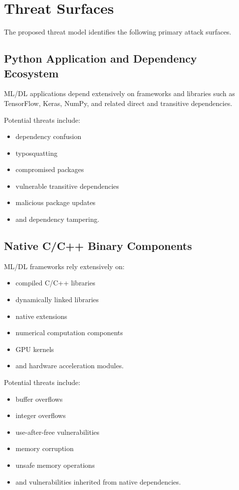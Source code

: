 \documentclass[
  12pt,
  letterpaper,
  oneside]{report}
\providecommand{\tightlist}{%
  \setlength{\itemsep}{0pt}\setlength{\parskip}{0pt}}
\begin{document}
\section{Threat Surfaces}\label{64-threat-surfaces}

The proposed threat model identifies the following primary attack
surfaces.

\subsection{Python Application and Dependency Ecosystem}\label{641-python-application-and-dependency-ecosystem}

ML/DL applications depend extensively on frameworks and libraries such
as TensorFlow, Keras, NumPy, and related direct and transitive
dependencies.

Potential threats include:

\begin{itemize}
\tightlist
\item
  dependency confusion
\item
  typosquatting
\item
  compromised packages
\item
  vulnerable transitive dependencies
\item
  malicious package updates
\item
  and dependency tampering.
\end{itemize}

\subsection{Native C/C++ Binary Components}\label{642-native-cc-binary-components}

ML/DL frameworks rely extensively on:

\begin{itemize}
\tightlist
\item
  compiled C/C++ libraries
\item
  dynamically linked libraries
\item
  native extensions
\item
  numerical computation components
\item
  GPU kernels
\item
  and hardware acceleration modules.
\end{itemize}

Potential threats include:

\begin{itemize}
\tightlist
\item
  buffer overflows
\item
  integer overflows
\item
  use-after-free vulnerabilities
\item
  memory corruption
\item
  unsafe memory operations
\item
  and vulnerabilities inherited from native dependencies.
\end{itemize}
\end{document}
